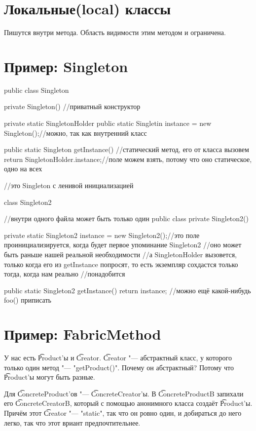\section{Локальные(local) классы}
Пишутся внутри метода. Область видимости этим методом и ограничена.


\section{Пример: Singleton}
\begin{javacode}
public class Singleton {
	private Singleton() {}//приватный конструктор

	private static SingletonHolder {
		public static Singletin instance = new Singleton();//можно, так как внутренний класс
	}

	public static Singleton getInstance() {//статический метод, его от класса вызовем
		return SingletonHolder.instance;//поле можем взять, потому что оно статическое, одно на всех
	}
} //это Singleton с ленивой инициализацией

class Singleton2 {//внутри одного файла может быть только один public class
	private Singleton2() {

	}

	private static Singleton2 instance = new Singleton2();//это поле проинициализируется, когда будет первое упоминание Singleton2
	//оно может быть раньше нашей реальной необходимости
	//а SingletonHolder вызовется, только когда его из getInstance попросят, то есть экземпляр сохдастся только тогда, когда нам реально
	//понадобится

	public static Singleton2 getInstance() {
		return instance;
	}
	//можно ещё какой-нибудь foo() приписать
}
\end{javacode}


\section{Пример: FabricMethod}
У нас есть \t{Product}'ы и \t{Creator}.
\t{Creator} "--- абстрактный класс, у которого только один метод "--- \java"getProduct()". 
Почему он абстрактный?  Потому что \t{Product}'ы могут быть разные.

Для \t{ConcreteProduct}'ов "--- \t{ConcreteCreator}'ы.
В \t{ConcreteProductB} запихали его \t{ConcreteCreatorB}, который с помощью анонимного класса создаёт \t{Product}'ы. 
Причём этот \t{Creator} "--- \java"static",
так что он ровно один, и добираться до него легко, так что этот вриант предпочтительнее.


